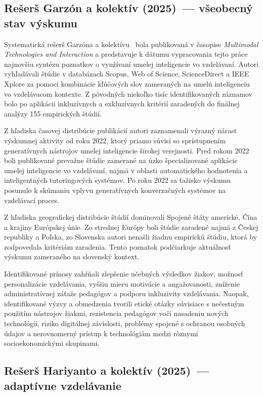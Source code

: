 \subsection{Rešerš Garzón a kolektív (2025)~--- všeobecný stav výskumu}

Systematická rešerš Garzóna a kolektívu~\cite{garzon2025systematic} bola publikovaná v časopise \textit{Multimodal Technologies and Interaction} a predstavuje k dátumu vypracovania tejto práce najnovšiu syntézu poznatkov o využívaní umelej inteligencie vo vzdelávaní. Autori vyhľadávali štúdie v databázach Scopus, Web of Science, ScienceDirect a IEEE Xplore za pomoci kombinácie kľúčových slov zameraných na umelú inteligenciu vo vzdelávacom kontexte. Z pôvodných niekoľko tisíc identifikovaných záznamov bolo po aplikácii inkluzívnych a exkluzívnych kritérií zaradených do finálnej analýzy 155 empirických štúdií.

Z hľadiska časovej distribúcie publikácií autori zaznamenali výrazný nárast výskumnej aktivity od roku 2022, ktorý priamo súvisí so sprístupnením generatívnych nástrojov umelej inteligencie širokej verejnosti. Pred rokom 2022 boli publikované prevažne štúdie zamerané na úzko špecializované aplikácie umelej inteligencie vo vzdelávaní, najmä v oblasti automatického hodnotenia a inteligentných tutoringových systémov. Po roku 2022 sa ťažisko výskumu posunulo k skúmaniu vplyvu generatívnych konverzačných systémov na vzdelávací proces.

Z hľadiska geografickej distribúcie štúdií dominovali Spojené štáty americké, Čína a krajiny Európskej únie. Zo strednej Európy boli štúdie zaradené najmä z Českej republiky a Poľska, zo Slovenska autori nenašli žiadnu empirickú štúdiu, ktorá by zodpovedala kritériám zaradenia. Tento poznatok podčiarkuje aktuálnosť výskumu zameraného na slovenský kontext.

Identifikované prínosy zahŕňali zlepšenie učebných výsledkov žiakov, možnosť personalizácie vzdelávania, vyššiu mieru motivácie a angažovanosti, zníženie administratívnej záťaže pedagógov a podporu inkluzivity vzdelávania. Naopak, identifikované výzvy a obmedzenia tvorili etické otázky súvisiace s nečestným použitím nástrojov žiakmi, rezistencia pedagógov voči nasadeniu nových technológií, riziko digitálnej závislosti, problémy spojené s ochranou osobných údajov a nerovnomerný prístup k technológiám medzi rôznymi socioekonomickými skupinami.


\subsection{Rešerš Hariyanto a kolektív (2025)~--- adaptívne vzdelávanie}

